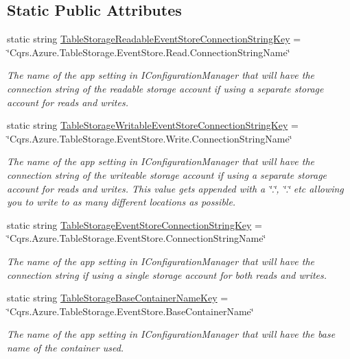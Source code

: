 \subsection*{Static Public Attributes}
\begin{DoxyCompactItemize}
\item 
static string \hyperlink{classCqrs_1_1Azure_1_1BlobStorage_1_1Events_1_1TableStorageEventStoreConnectionStringFactory_ac28aea2439fe0bed85d1b53c0fd8fdaf_ac28aea2439fe0bed85d1b53c0fd8fdaf}{Table\+Storage\+Readable\+Event\+Store\+Connection\+String\+Key} = \char`\"{}Cqrs.\+Azure.\+Table\+Storage.\+Event\+Store.\+Read.\+Connection\+String\+Name\char`\"{}
\begin{DoxyCompactList}\small\item\em The name of the app setting in I\+Configuration\+Manager that will have the connection string of the readable storage account if using a separate storage account for reads and writes. \end{DoxyCompactList}\item 
static string \hyperlink{classCqrs_1_1Azure_1_1BlobStorage_1_1Events_1_1TableStorageEventStoreConnectionStringFactory_a73df7618d5978a2c0d2e69880b799369_a73df7618d5978a2c0d2e69880b799369}{Table\+Storage\+Writable\+Event\+Store\+Connection\+String\+Key} = \char`\"{}Cqrs.\+Azure.\+Table\+Storage.\+Event\+Store.\+Write.\+Connection\+String\+Name\char`\"{}
\begin{DoxyCompactList}\small\item\em The name of the app setting in I\+Configuration\+Manager that will have the connection string of the writeable storage account if using a separate storage account for reads and writes. This value gets appended with a \char`\"{}.\char`\"{}, \char`\"{}.\char`\"{} etc allowing you to write to as many different locations as possible. \end{DoxyCompactList}\item 
static string \hyperlink{classCqrs_1_1Azure_1_1BlobStorage_1_1Events_1_1TableStorageEventStoreConnectionStringFactory_a95f8662029c8a40117e326973de936bf_a95f8662029c8a40117e326973de936bf}{Table\+Storage\+Event\+Store\+Connection\+String\+Key} = \char`\"{}Cqrs.\+Azure.\+Table\+Storage.\+Event\+Store.\+Connection\+String\+Name\char`\"{}
\begin{DoxyCompactList}\small\item\em The name of the app setting in I\+Configuration\+Manager that will have the connection string if using a single storage account for both reads and writes. \end{DoxyCompactList}\item 
static string \hyperlink{classCqrs_1_1Azure_1_1BlobStorage_1_1Events_1_1TableStorageEventStoreConnectionStringFactory_a9aad5e7497e3f5192d3aaec8d5f7b5f8_a9aad5e7497e3f5192d3aaec8d5f7b5f8}{Table\+Storage\+Base\+Container\+Name\+Key} = \char`\"{}Cqrs.\+Azure.\+Table\+Storage.\+Event\+Store.\+Base\+Container\+Name\char`\"{}
\begin{DoxyCompactList}\small\item\em The name of the app setting in I\+Configuration\+Manager that will have the base name of the container used. \end{DoxyCompactList}\end{DoxyCompactItemize}
